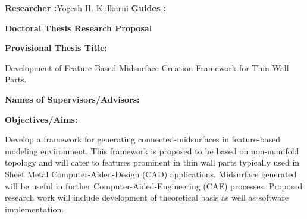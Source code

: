 \documentclass[a4paper]{article}
\begin{document}
\begin{center}  {\small 

									\textbf{Researcher :}Yogesh H. Kulkarni \hfill
									\textbf{Guides :} %
								}
\end{center}



\begin{center} {\large \textbf{Doctoral Thesis Research Proposal}} \end{center}

\begin{center} 
	\textbf{} 
\end{center} \vspace{-6mm}

\begin{center} \textbf{} \end{center} \vskip5mm


\textbf{Provisional Thesis Title:}

Development of Feature Based Midsurface Creation Framework for Thin Wall Parts.

\vskip5mm


\textbf{Names of Supervisors/Advisors:}


\vskip5mm


\textbf{Objectives/Aims:}

Develop a framework for generating connected-midsurfaces in feature-based modeling environment.
This framework is proposed to be based on non-manifold topology and will cater to features prominent in thin wall parts typically used in Sheet Metal Computer-Aided-Design (CAD) applications. Midsurface generated will be useful in further Computer-Aided-Engineering (CAE) processes. Proposed research work will include development of theoretical basis as well as software implementation.
\end{document}
